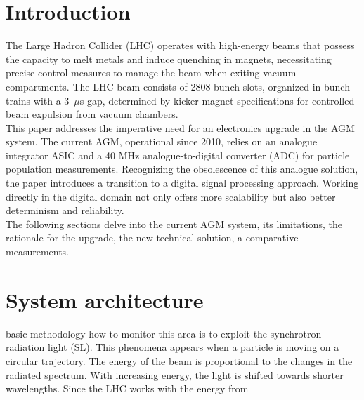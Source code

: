 \section{Introduction}
The Large Hadron Collider (LHC) operates with high-energy beams that possess
the capacity to melt metals and induce quenching in magnets, necessitating
precise control measures to manage the beam when exiting vacuum compartments.
The LHC beam consists of 2808 bunch slots, organized in bunch trains with a
3~$\mu$s gap, determined by kicker magnet specifications for controlled
beam expulsion from vacuum chambers.\\
This paper addresses the imperative need for an electronics upgrade in the AGM
system. The current AGM, operational since 2010, relies on an analogue
integrator ASIC and a 40 MHz analogue-to-digital converter (ADC) for particle
population measurements. Recognizing the obsolescence of this analogue
solution, the paper introduces a transition to a digital signal processing
approach. Working directly in the digital domain not only offers more
scalability but also better determinism and reliability.\\
The following sections delve into the current AGM system, its limitations, the
rationale for the upgrade, the new technical solution, a comparative
measurements.


\section{System architecture}
basic methodology how to monitor this area is to exploit the synchrotron
radiation light (SL). This phenomena appears when a particle is moving on a
circular trajectory. The energy of the beam is proportional to the changes in
the radiated spectrum. With increasing energy, the light is shifted towards
shorter wavelengths. Since the LHC works with the energy from 

